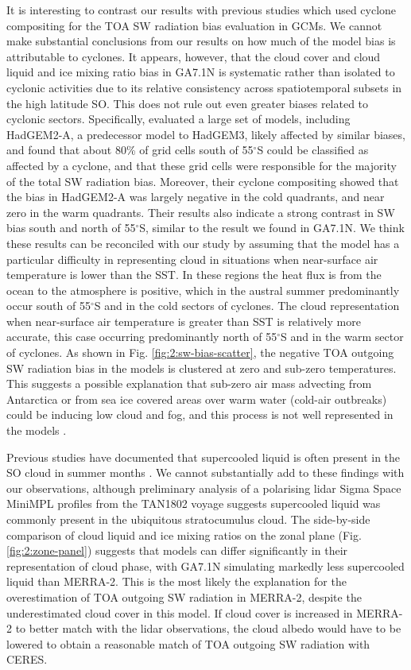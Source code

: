 It is interesting to contrast our results with previous studies which used
cyclone compositing for the TOA SW radiation bias evaluation in GCMs. We cannot
make substantial conclusions from our results on how much of the model bias is
attributable to cyclones. It appears, however, that the cloud cover and cloud
liquid and ice mixing ratio bias in GA7.1N is systematic rather than isolated to
cyclonic activities due to its relative consistency across spatiotemporal
subsets in the high latitude SO. This does not rule out even greater biases
related to cyclonic sectors. Specifically, \cite{bodas-salcedo2014} evaluated a
large set of models, including HadGEM2-A, a predecessor model to HadGEM3,
likely affected by similar biases, and found that about 80\% of grid cells
south of 55$^\circ$S could be classified as affected by a cyclone, and that
these grid cells were responsible for the majority of the total SW radiation
bias.  Moreover, their cyclone compositing showed that the bias in HadGEM2-A
was largely negative in the cold quadrants, and near zero in the warm
quadrants.  Their results also indicate a strong contrast in SW bias south and
north of 55$^\circ$S, similar to the result we found in GA7.1N.  We think these
results can be reconciled with our study by assuming that the model has a
particular difficulty in representing cloud in situations when near-surface air
temperature is lower than the SST. In these regions the heat flux is from the
ocean to the atmosphere is positive, which in the austral summer predominantly
occur south of 55$^\circ$S and in the cold sectors of cyclones. The cloud
representation when near-surface air temperature is greater than SST is
relatively more accurate, this case occurring predominantly north of
55$^\circ$S and in the warm sector of cyclones.  As shown in Fig.
\ref{fig:2:sw-bias-scatter}, the negative TOA outgoing SW radiation bias in the
models is clustered at zero and sub-zero temperatures. This suggests a
possible explanation that sub-zero air mass advecting from Antarctica or from
sea ice covered areas over warm water (cold-air outbreaks) could be inducing low cloud and fog, and
this process is not well represented in the models \citep{bodas-salcedo2012}.

Previous studies have documented that supercooled liquid is often present in
the SO cloud in summer months \citep{morrison2011,huang2012,chubb2013,huang2016,bodas-salcedo2016,jolly2018,listowski2019}. We cannot substantially add to these findings
with our observations, although preliminary analysis of a polarising lidar
Sigma Space MiniMPL profiles from the TAN1802 voyage suggests supercooled
liquid was commonly present in the ubiquitous stratocumulus cloud. The
side-by-side comparison of cloud liquid and ice mixing ratios on the zonal
plane (Fig. \ref{fig:2:zone-panel}) suggests that models can differ
significantly in their representation of cloud phase, with GA7.1N simulating
markedly less supercooled liquid than MERRA-2. This is the most likely
the explanation for the overestimation of TOA outgoing SW radiation in MERRA-2,
despite the underestimated cloud cover in this model. If cloud cover is
increased in MERRA-2 to better match with the lidar observations, the cloud
albedo would have to be lowered to obtain a reasonable match of TOA outgoing SW
radiation with CERES.

